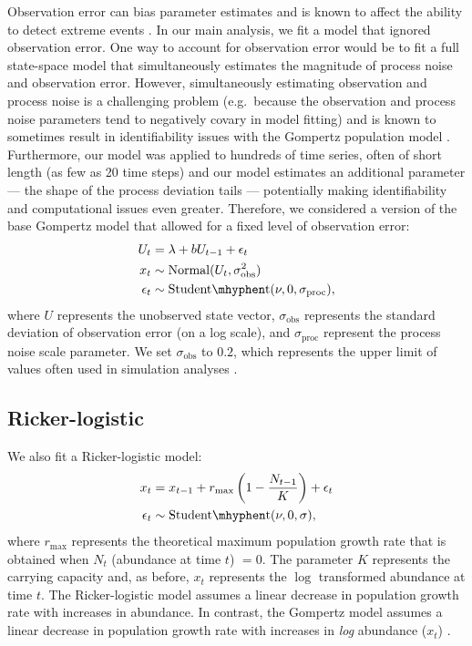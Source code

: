 Observation error can bias parameter estimates \citep[e.g.][]{knape2012} and is known to affect the ability to detect extreme events \citep{ward2007}. In our main analysis, we fit a model that ignored observation error. One way to account for observation error would be to fit a full state-space model that simultaneously estimates the magnitude of process noise and observation error. However, simultaneously estimating observation and process noise is a challenging problem (e.g.\ because the observation and process noise parameters tend to negatively covary in model fitting) and is known to sometimes result in identifiability issues with the Gompertz population model \citep{knape2008}. Furthermore, our model was applied to hundreds of time series, often of short length (as few as 20 time steps) and our model estimates an additional parameter --- the shape of the process deviation tails --- potentially making identifiability and computational issues even greater. Therefore, we considered a version of the base Gompertz model that allowed for a fixed level of observation error:
\begin{align*}
U_t &= \lambda + b U_{t-1} + \epsilon_t\\
x_t &\sim \mathrm{Normal}(U_t, \sigma_\mathrm{obs}^2)\\
\epsilon_t &\sim \mathrm{Student\mhyphen t}(\nu, 0, \sigma_\mathrm{proc}),
\end{align*}
where $U$ represents the unobserved state vector, $\sigma_\mathrm{obs}$ represents the standard deviation of observation error (on a log scale), and $\sigma_\mathrm{proc}$ represent the process noise scale parameter. We set $\sigma_\mathrm{obs}$ to $0.2$, which represents the upper limit of values often used in simulation analyses \citep[e.g.][]{valpine2002, thorson2014b}.

\subsection{Ricker-logistic}

We also fit a Ricker-logistic model:
\begin{align*}
x_t &= x_{t-1} + r_{\mathrm{max}}\left(1 - \frac{N_{t-1}}{K}\right) + \epsilon_t\\
\epsilon_t &\sim \mathrm{Student\mhyphen t}(\nu, 0, \sigma),
\end{align*}
where $r_\mathrm{max}$ represents the theoretical maximum population growth rate that is obtained when $N_t$ (abundance at time $t$) $= 0$. The parameter $K$ represents the carrying capacity and, as before, $x_t$ represents the $\log$ transformed abundance at time $t$. The Ricker-logistic model assumes a linear decrease in population growth rate with increases in abundance. In contrast, the Gompertz model assumes a linear decrease in population growth rate with increases in \textit{log} abundance ($x_t$) \citep[e.g.][]{thibaut2012}.

